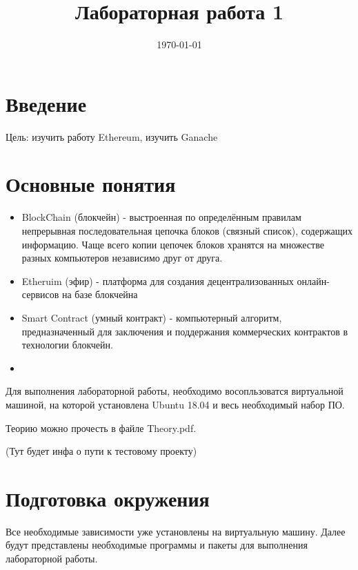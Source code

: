 \documentclass{article}
\begin{document}
\title{Лабораторная работа 1}

\date{\today}
\maketitle


\section{Введение}

Цель: изучить работу Ethereum, изучить Ganache


\section{Основные понятия}

\begin{itemize}
	\item BlockChain (блокчейн) - выстроенная по определённым правилам непрерывная последовательная цепочка блоков (связный список), содержащих информацию. Чаще всего копии цепочек блоков хранятся на множестве разных компьютеров независимо друг от друга. 
	\item Etheruim (эфир) -  платформа для создания децентрализованных онлайн-сервисов на базе блокчейна
	\item Smart Contract (умный контракт) - компьютерный алгоритм, предназначенный для заключения и поддержания коммерческих контрактов в технологии блокчейн. 
	\item 	
\end{itemize}


Для выполнения лабораторной работы, необходимо восопльзоватся виртуальной машиной, на которой установлена Ubuntu 18.04 и весь необходимый набор ПО.

Теорию можно прочесть в файле Theory.pdf.

(Тут будет инфа о пути к тестовому проекту)


\section{Подготовка окружения}

Все необходимые зависимости уже установлены на виртуальную машину. Далее будут представлены необходимые программы и пакеты для выполнения лабораторной работы. 
\end{document}
